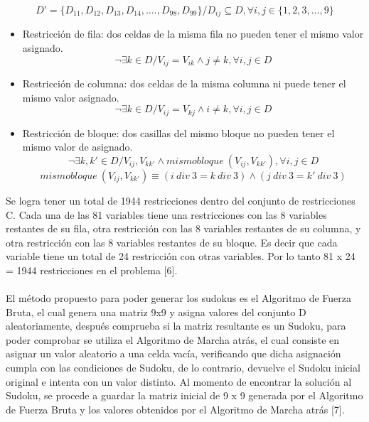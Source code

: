 \documentclass[14pt]{article}
\begin{document}
\[D’ = \{D_{11},D_{12},D_{13},D_{14},….,D_{98},D_{99}\} /  D_{ij} \subseteq  D, \forall i,j \in \{1,2,3,…,9\}\]

\begin{itemize}
	\item Restricción de fila: dos celdas de la misma fila no pueden tener el mismo valor asignado.
	\[ \neg \exists k \in D / V_{ij} = V_{ik} \wedge j \not= k,  \forall i,j \in D \]
\end{itemize}
\begin{itemize}
	\item Restricción de columna: dos celdas de la misma columna ni puede tener el mismo valor asignado.
	\[ \neg \exists k \in D / V_{ij} = V_{kj} \wedge i \not= k,  \forall i,j \in D \]
\end{itemize}
\begin{itemize}
	\item Restricción de bloque: dos casillas del mismo bloque no pueden tener el mismo valor de asignado.
	\[\neg \exists k,k' \in D / V_{ij}, V_{kk'} \wedge mismo bloque \ (V_{ij},V_{kk'}), \forall i, j \in D  \]
	\[mismo bloque \ (V_{ij}, V_{kk'}) \equiv (i \ div \ 3 = k \ div \ 3) \wedge (j \ div \ 3 = k' \ div \ 3)  \]
\end{itemize}
Se logra tener un total de 1944 restricciones dentro del conjunto de restricciones C. Cada una de las 81 variables tiene una restricciones con las 8 variables restantes de su fila, otra restricción con las 8 variables restantes de su columna, y otra restricción con las 8 variables restantes de su bloque. Es decir que cada variable tiene un total de 24 restricción con otras variables. Por lo tanto 81 x 24 = 1944 restricciones en el problema [6].
		\\~\\
El método propuesto para poder generar los sudokus es el Algoritmo de Fuerza Bruta, el cual genera una matriz 9x9 y asigna valores del conjunto D aleatoriamente, después comprueba si la matriz resultante es un Sudoku, para poder comprobar se utiliza el Algoritmo de Marcha atrás, el cual consiste en asignar un valor aleatorio a una celda vacía, verificando que dicha asignación cumpla con las condiciones de Sudoku, de lo contrario, devuelve el Sudoku inicial original e intenta con un valor distinto. Al momento de encontrar  la solución al Sudoku, se procede a guardar la matriz inicial de 9 x 9 generada por el Algoritmo de Fuerza Bruta y los valores obtenidos por el Algoritmo de Marcha atrás [7].
		\\~\\
\end{document}
